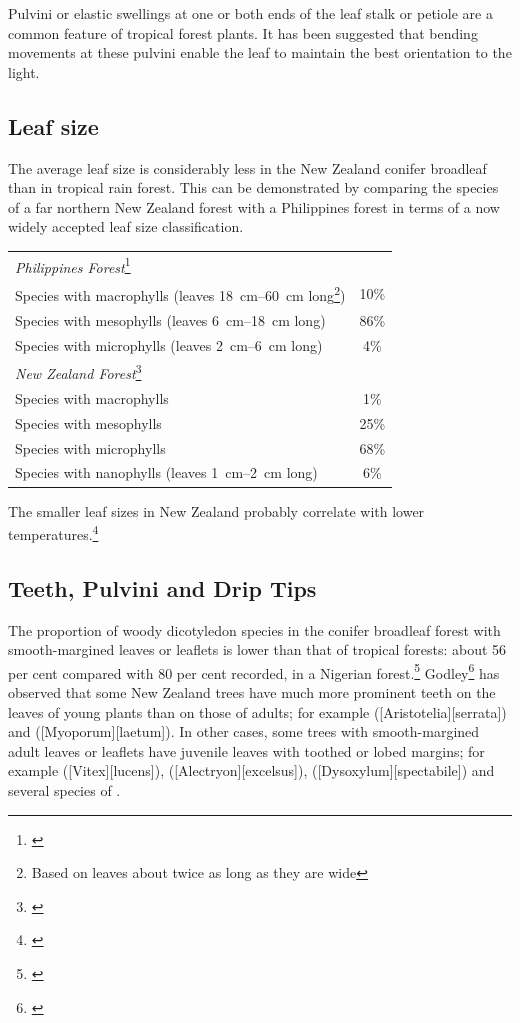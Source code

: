 Pulvini or elastic swellings at one or both ends of the leaf stalk or petiole are a common feature of tropical forest plants.
It has been suggested that bending movements at these pulvini enable the leaf to maintain the best orientation to the light.

\subsection{Leaf size}

The average leaf size is considerably less in the New Zealand conifer broadleaf than in tropical rain forest.
This can be demonstrated by comparing the species of a far northern New Zealand forest with a Philippines forest in terms of a now widely accepted leaf size classification.

\begin{tabular}{ l c }
	\toprule
	\emph{Philippines Forest}\footnote{\cite{richards1952tropical}}\\
	Species with macrophylls (leaves \SIrange{18}{60}{\centi\metre} long\footnote{Based on leaves about twice as long as they are wide}) & 10\%\\
	Species with mesophylls (leaves \SIrange{6}{18}{\centi\metre} long) & 86\%\\
	Species with microphylls (leaves \SIrange{2}{6}{\centi\metre} long) & 4\%\\
	\emph{New Zealand Forest}\footnote{\cite{dawson1969lowland}}\\
	Species with macrophylls & 1\%\\
	Species with mesophylls & 25\%\\
	Species with microphylls & 68\%\\
	Species with nanophylls (leaves \SIrange{1}{2}{\centi\metre} long) & 6\%\\
	\bottomrule
\end{tabular}

The smaller leaf sizes in New Zealand probably correlate with lower temperatures.\footnote{\cite{dawson1986floristic}}

\subsection{Teeth, Pulvini and Drip Tips}

The proportion of woody dicotyledon species in the conifer broadleaf forest with smooth-margined leaves or leaflets is lower than that of tropical forests: about 56 per cent compared with 80 per cent recorded, in a Nigerian forest.\footnote{\cite{richards1952tropical}}
Godley\footnote{\cite{godley1985paths}} has observed that some New Zealand trees have much more prominent teeth on the leaves of young plants than on those of adults; for example  ([Aristotelia][serrata]) and  ([Myoporum][laetum]).
In other cases, some trees with smooth-margined adult leaves or leaflets have juvenile leaves with toothed or lobed margins; for example  ([Vitex][lucens]),  ([Alectryon][excelsus]),  ([Dysoxylum][spectabile]) and several species of .

